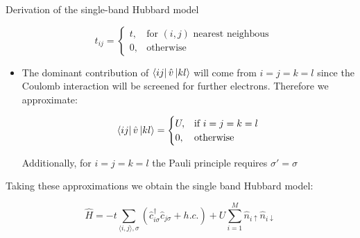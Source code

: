 \begin{section}{Derivation of the single-band Hubbard model}
\begin{itemize}
\begin{equation}
t_{ij} = \begin{cases}
             t,  & \text{for } (i,j) \text{ nearest neighbous} \\
             0,  & \text{otherwise}
       \end{cases} \quad
\end{equation}

\item The dominant contribution of $\bra{ij} \hat{v} \ket{kl}$ will come from $i=j=k=l$ since the Coulomb interaction will be screened for further electrons. Therefore we approximate:

\begin{equation}
\bra{ij} \hat{v} \ket{kl} =
	\begin{cases}
		U, & \text{if } i=j=k=l \\
		0, & \text{otherwise}
	\end{cases}						
\end{equation}

Additionally, for $i=j=k=l$ the Pauli principle requires $\sigma' = \sigma$

\end{itemize}

Taking these approximations we obtain the single band Hubbard model:

\begin{equation}
\label{Hubbard}
\hat{H} = -t\sum_{\langle i,j \rangle, \sigma}(\hat{c}_{i \sigma}^\dagger \hat{c}_{j \sigma} + h.c.) + U \sum_{i=1}^M \hat{n}_{i\uparrow}\hat{n}_{i\downarrow}
\end{equation}

\end{section}

